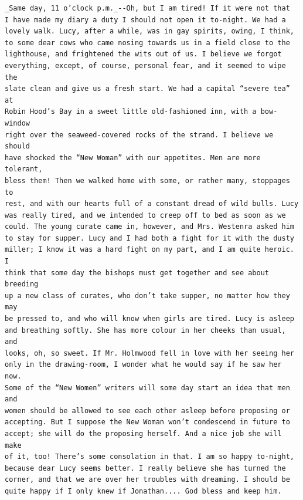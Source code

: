 \documentclass{article}
\begin{document}
\begin{verbatim}
_Same day, 11 o’clock p.m._--Oh, but I am tired! If it were not that
I have made my diary a duty I should not open it to-night. We had a
lovely walk. Lucy, after a while, was in gay spirits, owing, I think,
to some dear cows who came nosing towards us in a field close to the
lighthouse, and frightened the wits out of us. I believe we forgot
everything, except, of course, personal fear, and it seemed to wipe the
slate clean and give us a fresh start. We had a capital “severe tea” at
Robin Hood’s Bay in a sweet little old-fashioned inn, with a bow-window
right over the seaweed-covered rocks of the strand. I believe we should
have shocked the “New Woman” with our appetites. Men are more tolerant,
bless them! Then we walked home with some, or rather many, stoppages to
rest, and with our hearts full of a constant dread of wild bulls. Lucy
was really tired, and we intended to creep off to bed as soon as we
could. The young curate came in, however, and Mrs. Westenra asked him
to stay for supper. Lucy and I had both a fight for it with the dusty
miller; I know it was a hard fight on my part, and I am quite heroic. I
think that some day the bishops must get together and see about breeding
up a new class of curates, who don’t take supper, no matter how they may
be pressed to, and who will know when girls are tired. Lucy is asleep
and breathing softly. She has more colour in her cheeks than usual, and
looks, oh, so sweet. If Mr. Holmwood fell in love with her seeing her
only in the drawing-room, I wonder what he would say if he saw her now.
Some of the “New Women” writers will some day start an idea that men and
women should be allowed to see each other asleep before proposing or
accepting. But I suppose the New Woman won’t condescend in future to
accept; she will do the proposing herself. And a nice job she will make
of it, too! There’s some consolation in that. I am so happy to-night,
because dear Lucy seems better. I really believe she has turned the
corner, and that we are over her troubles with dreaming. I should be
quite happy if I only knew if Jonathan.... God bless and keep him.


\end{verbatim}
\end{document}
